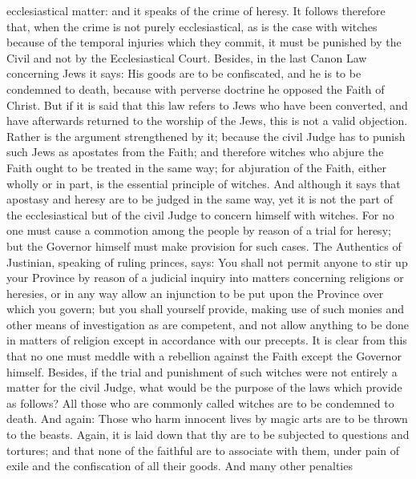        ecclesiastical matter: and it speaks of the crime of heresy. It follows therefore that, when the
       crime is not purely ecclesiastical, as is the case with witches because of the temporal injuries
       which they commit, it must be punished by the Civil and not by the Ecclesiastical Court.
             Besides, in the last Canon Law concerning Jews it says: His goods are to be
       confiscated, and he is to be condemned to death, because with perverse doctrine he opposed
       the Faith of Christ. But if it is said that this law refers to Jews who have been converted, and
       have afterwards returned to the worship of the Jews, this is not a valid objection. Rather is
       the argument strengthened by it; because the civil Judge has to punish such Jews as
       apostates from the Faith; and therefore witches who abjure the Faith ought to be treated in
       the same way; for abjuration of the Faith, either wholly or in part, is the essential principle
       of witches.
             And although it says that apostasy and heresy are to be judged in the same way, yet it is
       not the part of the ecclesiastical but of the civil Judge to concern himself with witches. For
       no one must cause a commotion among the people by reason of a trial for heresy; but the
       Governor himself must make provision for such cases.
             The Authentics of Justinian, speaking of ruling princes, says: You shall not permit
       anyone to stir up your Province by reason of a judicial inquiry into matters concerning
       religions or heresies, or in any way allow an injunction to be put upon the Province over
       which you govern; but you shall yourself provide, making use of such monies and other
       means of investigation as are competent, and not allow anything to be done in matters of
       religion except in accordance with our precepts. It is clear from this that no one must meddle
       with a rebellion against the Faith except the Governor himself.
             Besides, if the trial and punishment of such witches were not entirely a matter for the
       civil Judge, what would be the purpose of the laws which provide as follows? All those who
       are commonly called witches are to be condemned to death. And again: Those who harm
       innocent lives by magic arts are to be thrown to the beasts. Again, it is laid down that thy are
       to be subjected to questions and tortures; and that none of the faithful are to associate with
       them, under pain of exile and the confiscation of all their goods. And many other penalties
